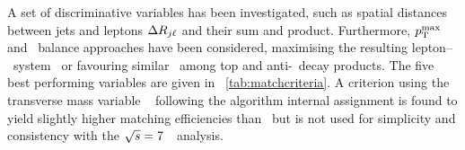 A set of discriminative variables has been investigated, such as spatial distances between jets and leptons $\Delta R_{j\ell}$ and their sum and product. Furthermore, $p_\mathrm{T}^\mathrm{max}$ and \pt\ balance approaches have been considered, maximising the resulting lepton--\bjet\ system \pt\ or favouring similar \pt\ among top and anti-\tquark\ decay products. 
%
The five best performing variables are given in \tab~\ref{tab:matchcriteria}.
%
A criterion using the transverse mass variable \mttwo~\cite{Barr:2003rg,Lester:1999tx} following the algorithm internal assignment is found to yield slightly higher matching efficiencies than \mlb\ but is not used for simplicity and consistency with the ${\sqrt{s}}=7$~\TeV\ analysis.













